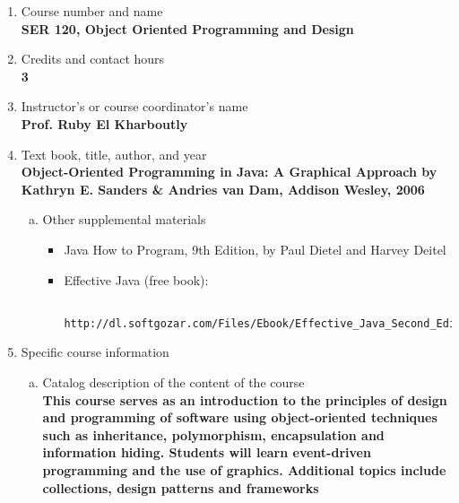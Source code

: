\label{SER120}  %
\begin{enumerate}[1.]
\item Course number and name\\
  {\bfseries
SER 120, Object Oriented Programming and Design
  }

\item Credits and contact hours\\
  {\bfseries
3
  }

\item Instructor's or course coordinator's name\\
  {\bfseries
Prof. Ruby El Kharboutly
  }

\item Text book, title, author, and year\\
  {\bfseries
    Object-Oriented Programming in Java: A Graphical Approach by Kathryn E.
    Sanders \& Andries van Dam, Addison Wesley, 2006
  }
\begin{enumerate}[a.]
\item Other supplemental materials\\
  {\bfseries
    \begin{itemize}
    \item Java How to Program, 9th Edition, by Paul Dietel and Harvey Deitel
    \item Effective Java (free book):
    \begin{verbatim}
      http://dl.softgozar.com/Files/Ebook/Effective_Java_Second_Edition_Softgozar.com.pdf
    \end{verbatim}
  \end{itemize}
  }
\end{enumerate}

\item Specific course information
\begin{enumerate}[a.]
\item Catalog description of the content of the course\\
  {\bfseries
This course serves as an introduction to the principles of design and programming of software using
object-oriented techniques such as inheritance, polymorphism, encapsulation and information hiding.
Students will learn event-driven programming and the use of graphics. Additional topics include
collections, design patterns and frameworks
  }


\end{enumerate}
\end{enumerate}
